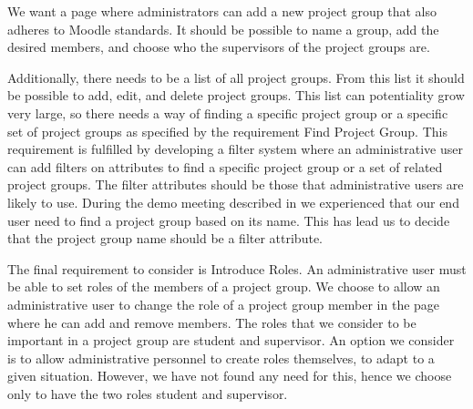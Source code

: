 We want a page where administrators can add a new project group that also adheres to Moodle standards.
It should be possible to name a group, add the desired members, and choose who the supervisors of the project groups are.

Additionally, there needs to be a list of all project groups.
From this list it should be possible to add, edit, and delete project groups. 
This list can potentiality grow very large, so there needs a way of finding a specific project group or a specific set of project groups as specified by the requirement Find Project Group.
This requirement is fulfilled by developing a filter system where an administrative user can add filters on attributes to find a specific project group or a set of related project groups.
The filter attributes should be those that administrative users are likely to use.
During the demo meeting described in  we experienced that our end user need to find a project group based on its name.
This has lead us to decide that the project group name should be a filter attribute.

The final requirement to consider is Introduce Roles.
An administrative user must be able to set roles of the members of a project group.
We choose to allow an administrative user to change the role of a project group member in the page where he can add and remove members.
The roles that we consider to be important in a project group are student and supervisor.
An option we consider is to allow administrative personnel to create roles themselves, to adapt to a given situation.
However, we have not found any need for this, hence we choose only to have the two roles student and supervisor.





